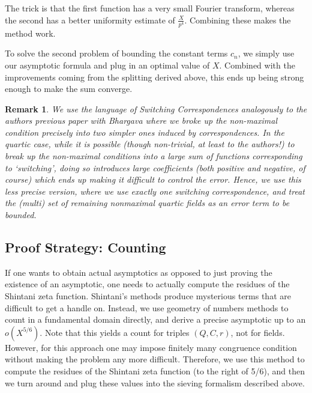 \documentclass{article}
\newtheorem{Remark}[Theorem]{Remark}
\begin{document}
The trick is that the first function has a very small Fourier transform, whereas the second has a better uniformity estimate of $\frac{X}{p^4}$. Combining these makes the method work. 

To solve the second problem of bounding the constant terms $c_n$, we simply use our asymptotic formula and plug in an optimal value of $X$. Combined with the improvements coming from the splitting derived above, this ends up being strong enough to make the sum converge.

\begin{Remark}{\rm 
    We use the language of \emph{Switching Correspondences} analogously to the authors previous paper with Bhargava \cite{BST} where we broke up the non-maximal condition \textit{precisely} into two simpler ones induced by correspondences. In the quartic case, while it is possible (though non-trivial, at least to the authors!) to break up the non-maximal conditions into a large sum of functions corresponding to `switching', doing so introduces large coefficients (both positive and negative, of course) which ends up making it difficult to control the error. Hence, we use this less precise version, where we use exactly one switching correspondence, and treat the (multi) set of remaining nonmaximal quartic fields as an error term to be bounded.
}\end{Remark}











\subsection{Proof Strategy: Counting}

If one wants to obtain actual asymptotics as opposed to just proving the existence of an asymptotic, one needs to actually compute the residues of the Shintani zeta function. Shintani's methods produce mysterious terms that are difficult to get a handle on. Instead, we use geometry of numbers methods to count in a fundamental domain directly, and derive a precise asymptotic up to an $o(X^{5/6})$. Note that this yields a count for triples $(Q,C,r)$, not for fields. However, for this approach one may impose finitely many congruence condition without making the problem any more difficult. Therefore, we use this method to compute the residues of the Shintani zeta function (to the right of 5/6), and then we turn around and plug these values into the sieving formalism described above.
\end{document}
